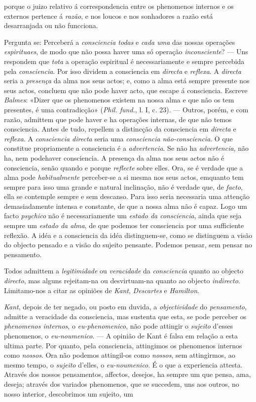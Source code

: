 porque o juizo relativo á correspondencia entre os phenomenos internos e os externos pertence á \emph{razão}, e nos loucos e nos sonhadores a razão está desarranjada ou não funcciona.\par Pergunta se: Perceberá a \emph{consciencia todas} e \emph{cada uma} das nossas operações \emph{espirituaes}, de modo que não possa haver uma só operação \emph{inconsciente}? --- Uns respondem que \emph{tota} a operação espiritual é necessariamente e sempre percebida pela \emph{consciencia}. Por isso dividem a consciencia em \emph{directa} e \emph{reflexa}. A \emph{directa} seria a \emph{presença} da alma nos seus actos; e, como a alma está sempre presente nos seus actos, concluem que não pode haver acto, que escape á consciencia. Escreve \emph{Balmes}: «Dizer que os phenomenos existem na nossa alma e que não os tem presentes, é uma contradicção» (\emph{Phil. fund.}, l. I, c. 23). --- Outros, porém, e com razão, admittem que pode haver e ha operações internas, de que não temos consciencia. Antes de tudo, repellem a distincção da consciencia em \emph{directa} e \emph{reflexa}. A \emph{consciencia directa} seria uma \emph{consciencia não-consciencia}. O que constitue propriamente a consciencia é a \emph{advertencia}. Se não ha \emph{advertencia}, não ha, nem podehaver consciencia. A presença da alma nos seus actos não é consciencia, senão quando e porque \emph{reflecte} sobre elles. Ora, se é verdade que a alma pode \emph{habitualmente} perceber-se a si mesma nos seus actos, emquanto tem sempre para isso uma grande e natural inclinação, não é verdade que, de \emph{facto}, ella se contemple sempre e sem descanso. Para isso seria necessaria uma attenção demasiadamente intensa e constante, de que a nossa alma não é capaz. Logo um facto \emph{psychico} não é necessariamente um \emph{estado da consciencia}, ainda que seja sempre um \emph{estado da alma}, de que podemos ter consciencia por uma sufficiente reflexão. A idéa e a consciencia da idéa distinguem-se, como se distinguem a visão do objecto pensado e a visão do sujeito pensante. Podemos pensar, sem pensar no pensamento.\par Todos admittem a \emph{legitimidade} ou \emph{veracidade} da \emph{consciencia} quanto ao objecto \emph{directo}, mas alguns rejeitam-na ou desvirtuam-na quanto ao objecto \emph{indirecto}. Limitamo-nos a citar as opiniões de \emph{Kant}, \emph{Descartes} e \emph{Hamilton}.\par \emph{Kant}, depois de ter negado, ou posto em duvida, a \emph{objectividade} do \emph{pensamento}, admitte a veracidade da consciencia, mas sustenta que esta, se pode perceber os \emph{phenomenos internos}, o \emph{eu-phenomenico}, não pode attingir o \emph{sujeito} d'esses phenomenos, o \emph{eu-noumenico}. --- A opinião de Kant é falsa em relação a esta ultima parte. Por quanto, pela consciencia, attingimos os phenomenos internos como \emph{nossos}. Ora não podemos attingil-os como \emph{nossos}, sem attingirmos, ao mesmo tempo, o \emph{sujeito} d'elles, o \emph{eu-noumenico}. É o que a experiencia attesta. Através dos nossos pensamentos, affectos, desejos, ha sempre um que pensa, ama, deseja; através dos variados phenomenos, que se succedem, uns aos outros, no nosso interior, descobrimos um sujeito, um 